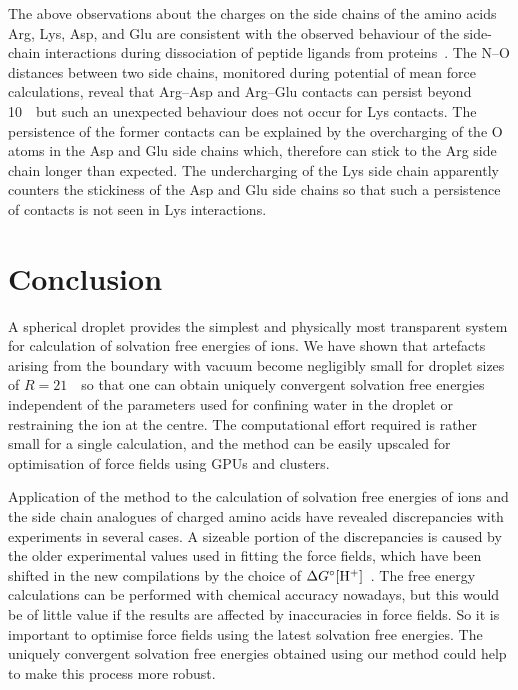 The above observations about the charges on the side chains of the amino acids Arg, Lys, Asp, and Glu 
are consistent with the observed behaviour of the side-chain interactions during dissociation of peptide 
ligands from proteins~\cite{Rashid2014,Rashid2012}. The N--O distances between two side chains, monitored 
during potential of mean force calculations, reveal that Arg--Asp and Arg--Glu contacts can persist beyond 
10~\angs\ but such an unexpected behaviour does not occur for Lys contacts. The persistence of the former 
contacts can be explained by the overcharging of the O atoms in the Asp and Glu side chains which, 
therefore can stick to the Arg side chain longer than expected. The undercharging of the Lys side chain 
apparently counters the stickiness of the Asp and Glu side chains so that such a persistence of contacts 
is not seen in Lys interactions. 

\section{Conclusion}
A spherical droplet provides the simplest and physically most transparent system for calculation of 
solvation free energies of ions. We have shown that artefacts arising from the boundary with vacuum 
become negligibly small for droplet sizes of $R=21$~\angs\ so that one can obtain uniquely convergent 
solvation free energies independent of the parameters used for confining water in the droplet or 
restraining the ion at the centre. The computational effort required is rather small for a single 
calculation, and the method can be easily upscaled for optimisation of force fields using GPUs and 
clusters.

Application of the method to the calculation of solvation free energies of ions and the side chain analogues 
of charged amino acids have revealed discrepancies with experiments in several cases. A sizeable portion 
of the discrepancies is caused by the older experimental values used in fitting the force fields, which 
have been shifted in the new compilations by the choice of $\Delta G^{\circ} [{\rm H}^+]$~\cite{Tissandier1998,Kelly2006}. 
The free energy calculations can be performed with chemical accuracy nowadays, but this would be of little 
value if the results are affected by inaccuracies in force fields. So it is important to optimise force 
fields using the latest solvation free energies. The uniquely convergent solvation free energies obtained 
using our method could help to make this process more robust.
